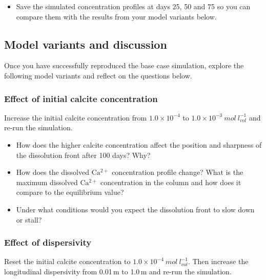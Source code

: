 \begin{itemize}
\item Save the simulated concentration profiles at days 25, 50 and 75
so you can compare them with the results from your model variants below.

\end{itemize}

\subsection[Model variants and discussion]{Model variants and discussion}

Once you have successfully reproduced the base case simulation, explore
the following model variants and reflect on the questions below.

\subsubsection*{Effect of initial calcite concentration}

Increase the initial calcite concentration from $1.0 \times 10^{-4}$ to
$1.0 \times 10^{-3}\ mol\ l^{-1}_{vol}$ and re-run the simulation.

\begin{itemize}

\item How does the higher calcite concentration affect the position and
sharpness of the dissolution front after 100 days?  Why?

\item How does the dissolved $\mathrm{Ca^{2+}}$ concentration profile
change?  What is the maximum dissolved $\mathrm{Ca^{2+}}$ concentration
in the column and how does it compare to the equilibrium value?

\item Under what conditions would you expect the dissolution front to
slow down or stall?

\end{itemize}

\subsubsection*{Effect of dispersivity}

Reset the initial calcite concentration to
$1.0 \times 10^{-4}\ mol\ l^{-1}_{vol}$.
Then increase the longitudinal dispersivity from 0.01\,m to 1.0\,m
and re-run the simulation.

